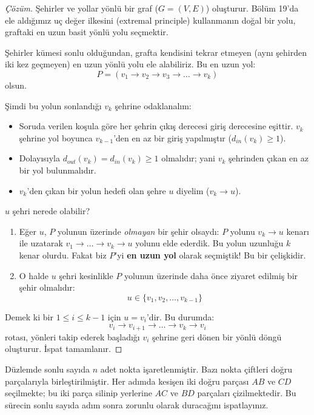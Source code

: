 \begin{proof}[Çözüm]
Şehirler ve yollar yönlü bir graf ($G = (V, E)$) oluşturur. Bölüm 19'da ele aldığımız uç değer ilkesini (extremal principle) kullanmanın doğal bir yolu, graftaki en uzun basit yönlü yolu seçmektir.

Şehirler kümesi sonlu olduğundan, grafta kendisini tekrar etmeyen (aynı şehirden iki kez geçmeyen) en uzun yönlü yolu ele alabiliriz.
Bu en uzun yol:
\[
P = (v_1 \to v_2 \to v_3 \to \dots \to v_k)
\]
olsun. 

Şimdi bu yolun sonlandığı $v_k$ şehrine odaklanalım:
\begin{itemize}
    \item Soruda verilen koşula göre her şehrin çıkış derecesi giriş derecesine eşittir. $v_k$ şehrine yol boyunca $v_{k-1}$'den en az bir giriş yapılmıştır ($d_{in}(v_k) \ge 1$).
    \item Dolayısıyla $d_{out}(v_k) = d_{in}(v_k) \ge 1$ olmalıdır; yani $v_k$ şehrinden çıkan en az bir yol bulunmalıdır.
    \item $v_k$'den çıkan bir yolun hedefi olan şehre $u$ diyelim ($v_k \to u$).
\end{itemize}

$u$ şehri nerede olabilir?
\begin{enumerate}
    \item Eğer $u$, $P$ yolunun üzerinde \emph{olmayan} bir şehir olsaydı:
    $P$ yolunu $v_k \to u$ kenarı ile uzatarak $v_1 \to \dots \to v_k \to u$ yolunu elde ederdik. Bu yolun uzunluğu $k$ kenar olurdu. Fakat biz $P$'yi \textbf{en uzun yol} olarak seçmiştik! Bu bir çelişkidir.
    \item O halde $u$ şehri kesinlikle $P$ yolunun üzerinde daha önce ziyaret edilmiş bir şehir olmalıdır:
    \[
    u \in \{v_1, v_2, \dots, v_{k-1}\}
    \]
\end{enumerate}
Demek ki bir $1 \le i \le k-1$ için $u = v_i$'dir.
Bu durumda:
\[
v_i \to v_{i+1} \to \dots \to v_k \to v_i
\]
rotası, yönleri takip ederek başladığı $v_i$ şehrine geri dönen bir yönlü döngü oluşturur. İspat tamamlanır.
\end{proof}

\begin{example}
Düzlemde sonlu sayıda $n$ adet nokta işaretlenmiştir. Bazı nokta çiftleri doğru parçalarıyla birleştirilmiştir. Her adımda kesişen iki doğru parçası $AB$ ve $CD$ seçilmekte; bu iki parça silinip yerlerine $AC$ ve $BD$ parçaları çizilmektedir. Bu sürecin sonlu sayıda adım sonra zorunlu olarak duracağını ispatlayınız.
\end{example}

